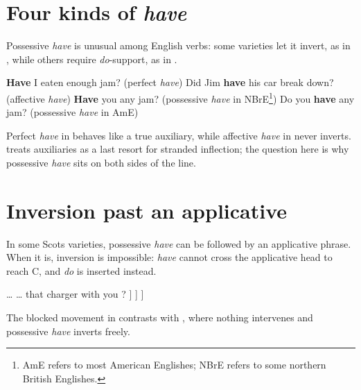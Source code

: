 
\begin{abstract}
English auxiliaries come in two kinds: those that move to C and those that need \textit{do}. This chapter argues that the difference lies not in the auxiliaries themselves but in where the head chain they belong to is pronounced.
\end{abstract}
\label{ch:chains}

\section{Four kinds of \textit{have}}\label{sec:have}

Possessive \textit{have} is unusual among English verbs: some varieties let it invert, as in \Next[c], while others require \textit{do}-support, as in \Next[d].

\pex {}
 \a \textbf{Have} I eaten enough jam? \hfill(perfect \textit{have})
    \a Did Jim \textbf{have} his car break down? \hfill(affective \textit{have})
    \a \textbf{Have} you any jam? \hfill (possessive \textit{have} in NBrE\footnote{AmE refers to most American Englishes; NBrE refers to some northern British Englishes.})
    \a Do you \textbf{have} any jam? \hfill (possessive \textit{have} in AmE) \xe

Perfect \textit{have} in \Last[a] behaves like a true auxiliary, while affective \textit{have} in \Last[b] never inverts. \citet{bjorkman2011} treats auxiliaries as a last resort for stranded inflection; the question here is why possessive \textit{have} sits on both sides of the line.

\section{Inversion past an applicative}\label{sec:appl}

In some Scots varieties, possessive \textit{have} can be followed by an applicative phrase. When it is, inversion is impossible: \textit{have} cannot cross the applicative head to reach C, and \textit{do} is inserted instead.

\ex {}     \dots {} \dots {}  that charger with you ? ] ] ]
     \xe

The blocked movement in  contrasts with \LLast[c], where nothing intervenes and possessive \textit{have} inverts freely.

